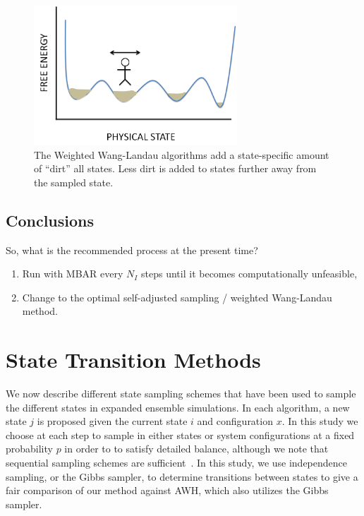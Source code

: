 \documentclass[superscriptaddress,showkeys, nofootinbib, pre, aps]{revtex4-1}
\begin{document}
\begin{figure}
    \begin{center}
        \includegraphics[width=3in]{figures/wwl.png}
        \caption{The Weighted Wang-Landau algorithms add a state-specific amount of ``dirt'' all states.  Less dirt is added to states further away from the sampled state.}
        \label{fig:wwl}
    \end{center}
\end{figure}

\subsection{Conclusions}
So, what is the recommended process at the present time?  

\begin{enumerate}
\item Run with MBAR every $N_I$ steps until it becomes computationally
unfeasible,
\item Change to the optimal self-adjusted sampling / weighted Wang-Landau method.
\end{enumerate}

\section{State Transition Methods}
We now describe different state sampling schemes that have been used to sample the
different states in expanded ensemble simulations.  In each
algorithm, a new state $j$ is proposed given the current state $i$ and
configuration $x$.  In this study we choose at each step to sample in
either states or system configurations at a fixed probability $p$ in
order to to satisfy detailed balance, although we note that sequential
sampling schemes are
sufficient~\cite{manousiouthakis:2753:detailedbalance}.  In this study, we use independence sampling, or the Gibbs sampler, to determine transitions between states to give a fair comparison of our method against AWH, which also utilizes the Gibbs sampler.
\end{document}

